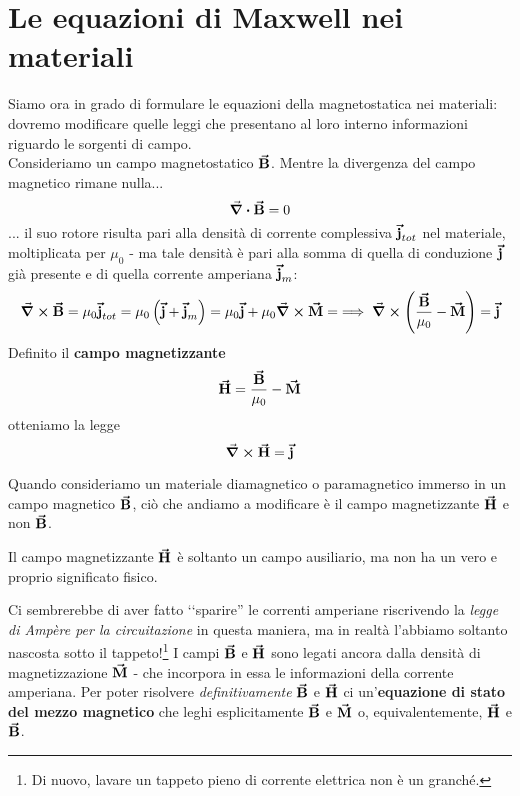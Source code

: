 \section{Le equazioni di Maxwell nei materiali}
Siamo ora in grado di formulare le equazioni della magnetostatica nei materiali: dovremo modificare quelle leggi che presentano al loro interno informazioni riguardo le sorgenti di campo.\\
Consideriamo un campo magnetostatico $\vb*{\va{B}}$. Mentre la divergenza del campo magnetico rimane nulla...
\begin{equation}
	\div{\vb*{\va{B}}}=0
\end{equation}
... il suo rotore risulta pari alla densità di corrente complessiva $\vb*{\va{j}}_{tot}$ nel materiale, moltiplicata per $\mu_0$ - ma tale densità è pari alla somma di quella di conduzione $\vb*{\va{j}}$ già presente e di quella corrente amperiana $\vb*{\va{j}}_m$:
\begin{equation*}
	\curl{\vb*{\va{B}}}=\mu_0\vb*{\va{j}}_{tot}=\mu_0\left(\vb*{\va{j}}+\vb*{\va{j}}_m\right)=\mu_0\vb*{\va{j}}+\mu_0\curl{\vb*{\va{M}}}=\implies \curl{\left(\frac{\vb*{\va{B}}}{\mu_0}-\vb*{\va{M}}\right)}=\vb*{\va{j}}
\end{equation*}
Definito il \textbf{campo magnetizzante}
\begin{equation}
	\vb*{\va{H}}=\frac{\vb*{\va{B}}}{\mu_0}-\vb*{\va{M}}
\end{equation}
otteniamo la legge
\begin{equation}
	\curl{\vb*{\va{H}}}=\vb*{\va{j}}\label{QuartaMaxwellMagnetUno}
\end{equation}
\begin{observe}
	Quando consideriamo un materiale diamagnetico o paramagnetico immerso in un campo magnetico $\vb*{\va{B}}$, ciò che andiamo a modificare è il campo magnetizzante $\vb*{\va{H}}$ e non $\vb*{\va{B}}$.
\end{observe}
\begin{attention}
	Il campo magnetizzante $\vb*{\va{H}}$ è soltanto un campo ausiliario, ma non ha un vero e proprio significato fisico.
\end{attention}
Ci sembrerebbe di aver fatto ‘‘sparire'' le correnti amperiane riscrivendo la \textit{legge di Ampère per la circuitazione} in questa maniera, ma in realtà l'abbiamo soltanto nascosta sotto il tappeto!\footnote{Di nuovo, lavare un tappeto pieno di corrente elettrica non è un granché.}  I campi $\vb*{\va{B}}$ e $\vb*{\va{H}}$ sono legati ancora dalla densità di magnetizzazione $\vb*{\va{M}}$ - che incorpora in essa le informazioni della corrente amperiana. Per poter risolvere \textit{definitivamente} $\vb*{\va{B}}$ e $\vb*{\va{H}}$ ci un'\textbf{equazione di stato del mezzo magnetico} che leghi esplicitamente $\vb*{\va{B}}$ e $\vb*{\va{M}}$ o, equivalentemente, $\vb*{\va{H}}$ e $\vb*{\va{B}}$.\\
